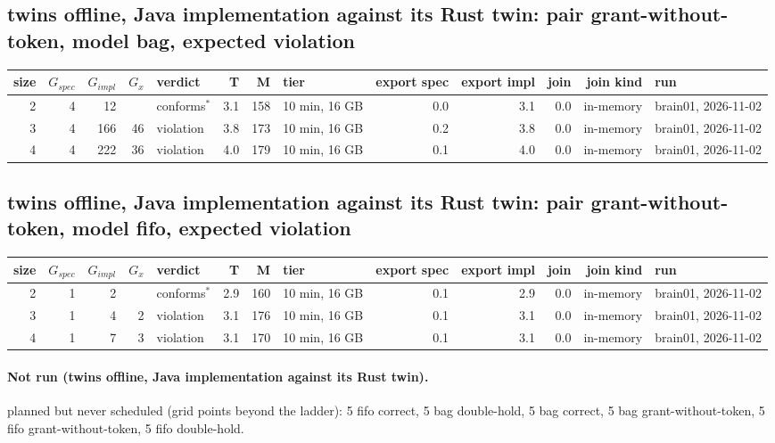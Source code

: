 \documentclass[10pt]{article}
\begin{document}
\subsection*{twins offline, Java implementation against its Rust twin: pair \textsf{grant-without-token}, model bag, expected violation}
\begin{longtable}{@{}rrrrlrrlrrrrl@{}}
\toprule
size & $G_{\mathit{spec}}$ & $G_{\mathit{impl}}$ & $G_x$ & verdict & T & M & tier & export spec & export impl & join & join kind & run \\
\midrule
\endhead
\color{red} 2 & 4 & 12 &  & conforms$^{\ast}$ & 3.1 & 158 & 10 min, 16 GB & 0.0 & 3.1 & 0.0 & in-memory & brain01, 2026-11-02 \\
\color{red} 3 & 4 & 166 & 46 & violation & 3.8 & 173 & 10 min, 16 GB & 0.2 & 3.8 & 0.0 & in-memory & brain01, 2026-11-02 \\
\color{red} 4 & 4 & 222 & 36 & violation & 4.0 & 179 & 10 min, 16 GB & 0.1 & 4.0 & 0.0 & in-memory & brain01, 2026-11-02 \\
\bottomrule
\end{longtable}
\subsection*{twins offline, Java implementation against its Rust twin: pair \textsf{grant-without-token}, model fifo, expected violation}
\begin{longtable}{@{}rrrrlrrlrrrrl@{}}
\toprule
size & $G_{\mathit{spec}}$ & $G_{\mathit{impl}}$ & $G_x$ & verdict & T & M & tier & export spec & export impl & join & join kind & run \\
\midrule
\endhead
\color{red} 2 & 1 & 2 &  & conforms$^{\ast}$ & 2.9 & 160 & 10 min, 16 GB & 0.1 & 2.9 & 0.0 & in-memory & brain01, 2026-11-02 \\
\color{red} 3 & 1 & 4 & 2 & violation & 3.1 & 176 & 10 min, 16 GB & 0.1 & 3.1 & 0.0 & in-memory & brain01, 2026-11-02 \\
\color{red} 4 & 1 & 7 & 3 & violation & 3.1 & 170 & 10 min, 16 GB & 0.1 & 3.1 & 0.0 & in-memory & brain01, 2026-11-02 \\
\bottomrule
\end{longtable}
\paragraph{Not run (twins offline, Java implementation against its Rust twin).}
planned but never scheduled (grid points beyond the ladder): 5 fifo correct, 5 bag double-hold, 5 bag correct, 5 bag grant-without-token, 5 fifo grant-without-token, 5 fifo double-hold.\par
\end{document}
